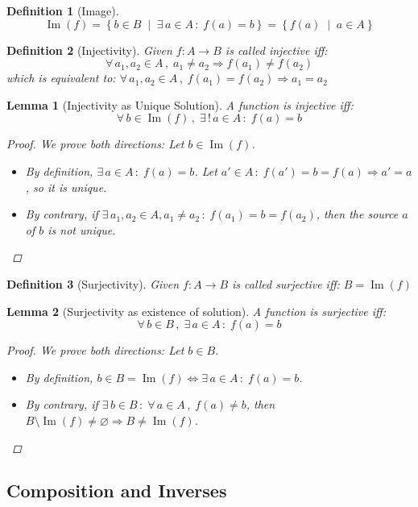\documentclass[12pt]{article}
\let\emptyset\varnothing
\let\RA\Rightarrow
\let\LA\Leftarrow
\let\LR\Leftrightarrow
\newcommand{\set}[2]{\left\{{#1}\;\middle|\;{#2}\right\}}
\newcommand{\Forall}[1]{\forall\,{#1}\,,\;}
\newcommand{\Exist}[1]{\exists\,{#1}\,:\;}
\DeclareMathOperator{\Image}{Im}
\newtheorem{definition}{Definition}[subsection]
\newtheorem{lemma}{Lemma}[subsection]
\begin{document}
\begin{definition}[Image]
  $$\Image(f)=\set{b\in B}{\Exist{a\in A}f(a)=b}=\set{f(a)}{a\in A}$$
\end{definition}

\begin{definition}[Injectivity]
  Given $f: A \to B$ is called injective iff: $$\Forall{a_1,a_2\in A} a_1\neq a_2\RA f(a_1)\neq f(a_2)$$ which is equivalent to: $\Forall{a_1,a_2\in A}f(a_1)= f(a_2)\RA a_1= a_2$
\end{definition}

\begin{lemma}[Injectivity as Unique Solution]
  A function is injective iff: $$\Forall{b\in\Image(f)}\Exist{!\,a\in A} f(a)=b$$
  \begin{proof}
    We prove both directions: Let $b\in\Image(f)$.
    \begin{itemize}
      \item[$(\RA)$] By definition, $\Exist{a\in A}f(a)=b$. Let $a'\in A\,:\;f(a')=b=f(a)\RA a'=a$, so it is unique.
      \item[$(\LA)$] By contrary, if $\Exist{a_1,a_2\in A, a_1\neq a_2}f(a_1)=b=f(a_2)$, then the source $a$ of $b$ is not unique.
    \end{itemize}
  \end{proof}
\end{lemma}

\begin{definition}[Surjectivity]
  Given $f:A\to B$ is called surjective iff: $B=\Image(f)$
\end{definition}

\begin{lemma}[Surjectivity as existence of solution]
  A function is surjective iff: $$\Forall{b\in B}\Exist{a\in A} f(a)=b$$
  \begin{proof}
    We prove both directions: Let $b\in B$.
    \begin{itemize}
      \item[$(\RA)$] By definition, $b\in B=\Image(f)\LR \Exist{a\in A}f(a)=b$.
      \item[$(\LA)$] By contrary, if $\Exist{b\in B}\Forall{a\in A} f(a)\neq b$, then $B\setminus\Image(f)\neq \emptyset\RA B\neq \Image(f)$.
    \end{itemize}
  \end{proof}
\end{lemma}

\subsection{Composition and Inverses}
\end{document}
